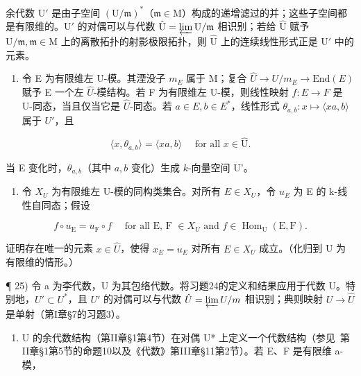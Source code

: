 余代数 \(\mathrm{U}'\) 是由子空间 \((\mathrm{U} / \mathfrak{m})^*\)（\(\mathfrak{m} \in \mathrm{M}\)）构成的递增滤过的并；这些子空间都是有限维的。\(\mathrm{U}'\) 的对偶可以与代数 \(\hat{\mathrm{U}} = \varprojlim \mathrm{U} / \mathfrak{m}\) 相识别；若给 \(\hat{\mathrm{U}}\) 赋予 \(\mathrm{U} / \mathfrak{m}, \mathfrak{m} \in \mathrm{M}\) 上的离散拓扑的射影极限拓扑，则 \(\hat{\mathrm{U}}\) 上的连续线性形式正是 \(\mathrm{U}'\) 中的元素。


\begin{enumerate}
\def\labelenumi{\alph{enumi})}
\setcounter{enumi}{1}
\tightlist
\item
  令 E 为有限维左 U-模。其湮没子 \(m_{E}\) 属于 M；复合 \(\hat{U} \to U/m_{E} \to \text{End}(E)\) 赋予 E 一个左 \(\hat{U}\)-模结构。若 F 为有限维左 U-模，则线性映射 \(f : E \to F\) 是 U-同态，当且仅当它是 \(\hat{U}\)-同态。若 \(a \in E, b \in E^{*}\)，线性形式 \(\theta_{a,b} : x \mapsto \langle xa, b \rangle\) 属于 \(U'\)，且
\end{enumerate}

\[
\langle x, \theta_ {a, b} \rangle = \langle x a, b \rangle \quad \text { for   all } x \in \hat {\mathrm{U}}.
\]

  当 E 变化时，\(\theta_{a,b}\)（其中 \(a,b\) 变化）生成 \(k\)-向量空间 U'。

\begin{enumerate}
\def\labelenumi{\alph{enumi})}
\setcounter{enumi}{2}
\tightlist
\item
  令 \(X_{U}\) 为有限维左 U-模的同构类集合。对所有 \(E \in X_{U}\)，令 \(u_{E}\) 为 E 的 k-线性自同态；假设
\end{enumerate}

\[
f \circ u _ {\mathrm{E}} = u _ {\mathrm{F}} \circ f \quad \text { for   all   E, F } \in X_{U} \text { and } f \in \operatorname{Hom} _ {\mathrm{U}} (\mathrm{E,F}).
\]

证明存在唯一的元素 \(x \in \hat{U}\)，使得 \(x_{E} = u_{E}\) 对所有 \(E \in X_{U}\) 成立。（化归到 U 为有限维的情形。）

¶ 25) 令 a 为李代数，U 为其包络代数。将习题24的定义和结果应用于代数 U。特别地，\(U' \subset U^*\)，且 \(U'\) 的对偶可以与代数 \(\hat{U} = \varprojlim U/m\) 相识别；典则映射 \(U \to \hat{U}\) 是单射（第I章§7的习题3）。

\begin{enumerate}
\def\labelenumi{\alph{enumi})}
\tightlist
\item
  U 的余代数结构（第II章§1第4节）在对偶 U* 上定义一个代数结构（参见~第II章§1第5节的命题10以及《代数》第III章§11第2节）。若 E、F 是有限维 a-模，
\end{enumerate}

